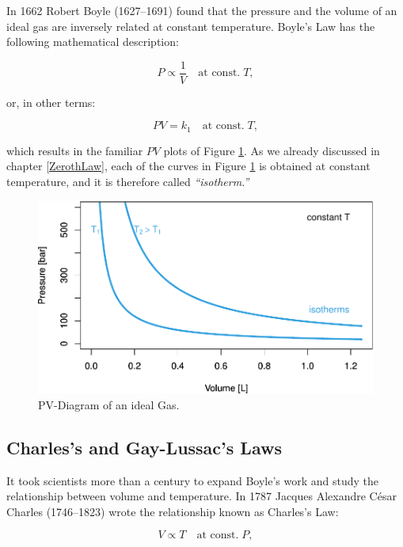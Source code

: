 \documentclass[
  9pt,
]{extbook}
\theoremstyle{definition}
\theoremstyle{definition}
\theoremstyle{definition}
\theoremstyle{remark}
\begin{document}
In 1662 Robert Boyle (1627--1691) found that the pressure and the volume of an ideal gas are inversely related at constant temperature. Boyle's Law has the following mathematical description:

\begin{equation}
P\propto\frac{1}{V}\quad\text{at const.}\;T,
\label{eq:boylelaw1}
\end{equation}

or, in other terms:

\begin{equation}
PV=k_1\quad\text{at const.}\;T,
\label{eq:boylelaw2}
\end{equation}

which results in the familiar \(PV\) plots of Figure \ref{fig:FigPVideal}. As we already discussed in chapter \ref{ZerothLaw}, each of the curves in Figure \ref{fig:FigPVideal} is obtained at constant temperature, and it is therefore called \emph{``isotherm.''}

\begin{figure}

{\centering \includegraphics[width=0.7\linewidth]{pchem1_files/figure-latex/FigPVideal-1} 

}

\caption{PV-Diagram of an ideal Gas.}\label{fig:FigPVideal}
\end{figure}

\hypertarget{charless-and-gay-lussacs-laws}{%
\subsection{Charles's and Gay-Lussac's Laws}\label{charless-and-gay-lussacs-laws}}

It took scientists more than a century to expand Boyle's work and study the relationship between volume and temperature. In 1787 Jacques Alexandre César Charles (1746--1823) wrote the relationship known as Charles's Law:

\begin{equation}
V\propto T\quad\text{at const.}\;P,
\label{eq:charleslaw1}
\end{equation}
\end{document}
